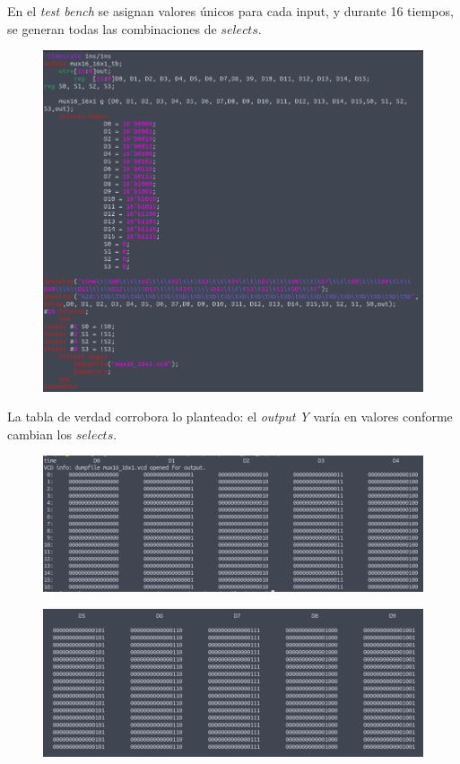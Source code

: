 \documentclass[11pt,a4paper]{article}
\begin{document}
\begin{enumerate}
\begin{enumerate}[label=(\alph*)]
En el \textit{test bench} se asignan valores únicos para cada input, y durante 16 tiempos, se generan todas las combinaciones de $selects$.
\pagebreak
\begin{figure}[h!]
\centering
\includegraphics[scale=0.4]{16_16x1MUX_5.png} 
\end{figure}

La tabla de verdad corrobora lo planteado: el \textit{output Y} varía en valores conforme cambian los $selects$.
\begin{figure}[h!]
\centering
\includegraphics[scale=0.7]{16_16x1MUX_61.png} 
\end{figure}

\pagebreak
\begin{figure}[h!]
\centering
\includegraphics[scale=0.7]{16_16x1MUX_62.png} 
\end{figure}


\end{enumerate}
\end{enumerate}
\end{document}
